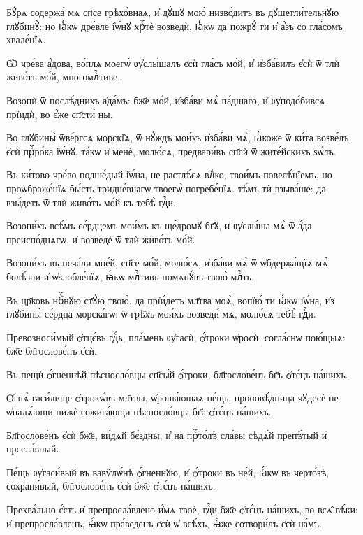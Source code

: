 \hKv Бꙋ́рѧ содержа́ мѧ сп҃се грѣхо́внаѧ, и҆ дꙋ́шꙋ мою̀  низво́дитъ въ дꙋшетли́тельнꙋю глꙋбинꙋ̀: но ꙗ҆́кѡ дре́вле  і҆ѡ́нꙋ хрⷭ҇тѐ возведѝ, ꙗ҆́кѡ да пожрꙋ́ ти и҆ а҆́зъ со  гла́сомъ хвале́нїѧ. 

\hKv Ѿ чре́ва а҆́дова, во́плѧ моегѡ̀ ᲂу҆слы́шалъ є҆сѝ гла́съ  мо́й, и҆ и҆зба́вилъ є҆сѝ ѿ тлѝ живо́тъ мо́й,  многомлⷭ҇тиве.  

\hKv Возопѝ ѿ послѣ́днихъ а҆да́мъ: бж҃е мо́й, и҆зба́ви мѧ̀  па́дшаго, и҆ ᲂу҆подо́бивсѧ прїидѝ, во є҆́же сп҃сти́ ны. 

\hKv Во глꙋбины̀ ѿве́ргсѧ морскі̑ѧ, ѿ нꙋ́ждъ мои́хъ и҆зба́ви  мѧ̀, ꙗ҆́коже ѿ ки́та возве́лъ є҆сѝ прⷪ҇ро́ка і҆ѡ́нꙋ,  та́кѡ и҆ менѐ, молю́сѧ, предвари́въ сп҃сѝ ѿ жите́йскихъ  ѕѡ́лъ. 

\hKv Въ ки́тово чре́во подше́дый і҆ѡ́на, не растлѣ́сѧ влⷣко,  твои́мъ повелѣ́нїемъ, но проѡбраже́нїѧ бы́сть тридне́внагѡ  твоегѡ̀ погребе́нїѧ. тѣ́мъ тѝ взыва́ше: да взы́детъ ѿ  тлѝ живо́тъ мо́й къ тебѣ̀ гдⷭ҇и. 

\hKv Возопи́хъ всѣ́мъ се́рдцемъ мои́мъ къ ще́дромꙋ бг҃ꙋ, и҆  ᲂу҆слы́ша мѧ̀ ѿ а҆́да преиспо́днѧгѡ, и҆ возведѐ ѿ тлѝ  живо́тъ мо́й.  

\hKv Возопи́хъ въ печа́ли мое́й, сп҃се мо́й, молю́сѧ, и҆зба́ви  мѧ̀ ѿ ѡ҆бдержа́щїѧ мѧ̀ болѣ́зни и҆ ѡ҆ѕлобле́нїѧ, ꙗ҆́кѡ  млⷭ҇тивъ помѧнꙋ́въ твою̀ млⷭ҇ть. 

\hKv Въ цр҃ковь нбⷭ҇нꙋю ст҃ꙋ́ю твою̀, да прїи́детъ  мл҃тва моѧ̀, вопїю́ ти ꙗ҆́кѡ і҆ѡ́на,  и҆з̾ глꙋбины̀ се́рдца морска́гѡ: ѿ грѣ̑хъ мои́хъ  возведи́ мѧ, молю́сѧ тебѣ̀ гдⷭ҇и. 
%

\hKv Превозноси́мый ѻ҆тцє́въ гдⷭ҇ь, пла́мень ᲂу҆гасѝ,  ѻ҆́троки ѡ҆росѝ, согла́снѡ пою́щыѧ: бж҃е бл҃гослове́нъ  є҆сѝ. 
%

\hKv Въ пещѝ ѻ҆́гненнѣй пѣсносло́вцы сп҃сы́й  ѻ҆́троки, бл҃гослове́нъ бг҃ъ ѻ҆тє́цъ на́шихъ. 
%

\hKv Ѻ҆гнѧ̀ гаси́лище ѻ҆трокѡ́въ мл҃твы, ѡ҆роша́ющаѧ пе́щь,  проповѣ́дница чꙋдесѐ не ѡ҆палѧ́ющи нижѐ сожига́ющи  пѣсносло́вцы бг҃а ѻ҆тє́цъ на́шихъ. 

\hKv Бл҃гослове́нъ є҆сѝ бж҃е, ви́дѧй бє́здны, и҆ на прⷭ҇то́лѣ  сла́вы сѣдѧ́й препѣ́тый и҆ пресла́вный.  

\hKv Пе́щь ᲂу҆гаси́вый въ вавѷлѡ́нѣ ѻ҆́гненнꙋю, и҆ ѻ҆́троки  въ не́й, ꙗ҆́кѡ въ черто́зѣ, сохрани́вый, бл҃гослове́нъ  є҆сѝ бж҃е ѻ҆тє́цъ на́шихъ. 

\hKv Прехва́льно є҆́сть и҆ препросла́влено и҆́мѧ твоѐ, гдⷭ҇и  бж҃е ѻ҆тє́цъ на́шихъ, во всѧ̑ вѣ́ки: и҆ препросла́вленъ,  ꙗ҆́кѡ пра́веденъ є҆сѝ ѡ҆ всѣ́хъ, ꙗ҆̀же сотвори́лъ  є҆сѝ на́мъ. 


